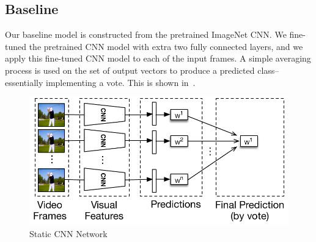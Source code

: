 \subsection{Baseline}
Our baseline model is constructed from the pretrained ImageNet CNN. We fine-tuned the pretrained CNN model with extra two fully connected layers, and we apply this fine-tuned CNN model to each of the input frames. A simple averaging process is used on the set of output vectors to produce a predicted class-- essentially implementing a vote. This is shown in~. 
\begin{figure}
  \centering
  \includegraphics[width=1.0\linewidth]{figs/cnn}
  \caption{Static CNN Network}
  \label{fig:cnn}
\end{figure}



